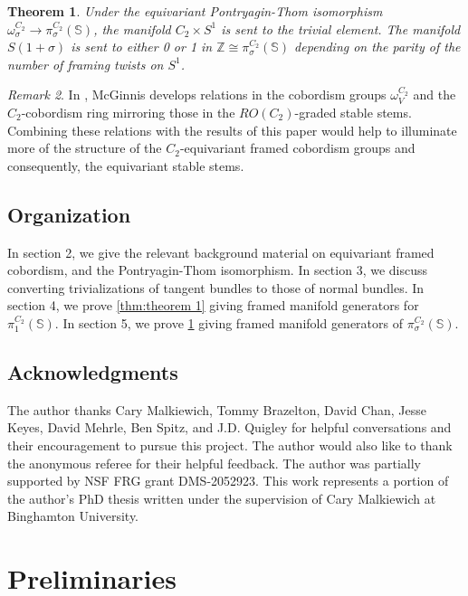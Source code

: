 \documentclass[11pt]{amsart}
\newcommand{\Z}{\mathbb{Z}}
\newcommand{\Sph}{\mathbb{S}}
\theoremstyle{plain}   %
\newtheorem{thm}{Theorem}[section] %
\theoremstyle{definition}
\theoremstyle{remark}
\newtheorem{rmk}[thm]{Remark}
\numberwithin{equation}{section}
\begin{document}
\begin{thm}\label{thm:theorem 2}
Under the equivariant Pontryagin-Thom isomorphism $\omega_\sigma^{C_2}\to \pi_\sigma^{C_2}(\Sph)$, the manifold $C_2\times S^1$ is sent to the trivial element. The manifold $S(1+\sigma)$ is sent to either 0 or 1 in $\Z\cong\pi_\sigma^{C_2}(\Sph)$ depending on the parity of the number of framing twists on $S^1$.
\end{thm}

\begin{rmk}
In \cite{mcginnis_thesis}, McGinnis develops relations in the cobordism groups $\omega_V^{C_2}$ and the $C_2$-cobordism ring mirroring those in the $RO(C_2)$-graded stable stems. Combining these relations with the results of this paper would help to illuminate more of the structure of the $C_2$-equivariant framed cobordism groups and consequently, the equivariant stable stems. 
\end{rmk}

\subsection{Organization}

In section 2, we give the relevant background material on equivariant framed cobordism, and the Pontryagin-Thom isomorphism. In section 3, we discuss converting trivializations of tangent bundles to those of normal bundles. In section 4, we prove \cref{thm:theorem 1} giving framed manifold generators for $\pi_1^{C_2}(\Sph)$. In section 5, we prove \cref{thm:theorem 2} giving framed manifold generators of $\pi_\sigma^{C_2}(\Sph)$. 

\subsection{Acknowledgments}

The author thanks Cary Malkiewich, Tommy Brazelton, David Chan, Jesse Keyes, David Mehrle, Ben Spitz, and J.D. Quigley for helpful conversations and their encouragement to pursue this project. The author would also like to thank the anonymous referee for their helpful feedback. The author was partially supported by NSF FRG grant DMS-2052923. This work represents a portion of the author's PhD thesis written under the supervision of Cary Malkiewich at Binghamton University. 

\section{Preliminaries}
\end{document}
